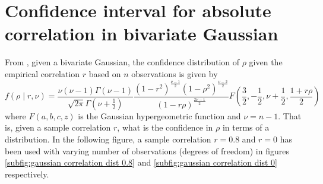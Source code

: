\documentclass[../Thesis.tex]{subfiles}
\begin{document}
\newpage
\section{Confidence interval for absolute correlation in bivariate Gaussian}\label{sec:bivar gauss abs correlation CI}
From \cite{Confidence_in_Correlation}, given a bivariate Gaussian, the confidence distribution of $\rho$ given the empirical correlation $r$ based on $n$ observations is given by
$$f\left(\rho \mid r,\nu\right) = \frac{\nu (\nu-1) \Gamma(\nu-1)}{\sqrt{2\pi} \Gamma(\nu + \frac{1}{2})} \frac{\left(1-r^2\right)^{\frac{\nu-1}{2}} \left(1-\rho^2\right)^{\frac{\nu-2}{2}} }{\left(1-r\rho\right)^{\frac{2\nu-1}{2}}} F\left(\frac{3}{2}, -\frac{1}{2}, \nu+\frac{1}{2}, \frac{1+r\rho}{2}\right)$$
where $F\left(a,b,c,z\right)$ is the Gaussian hypergeometric function and $\nu = n-1$. That is, given a sample correlation $r$, what is the confidence in $\rho$ in terms of a distribution. In the following figure, a sample correlation $r=0.8$ and $r=0$ has been used with varying number of observations (degrees of freedom) in figures \autoref{subfig:gaussian correlation dist 0.8} and \autoref{subfig:gaussian correlation dist 0} respectively.
\end{document}
